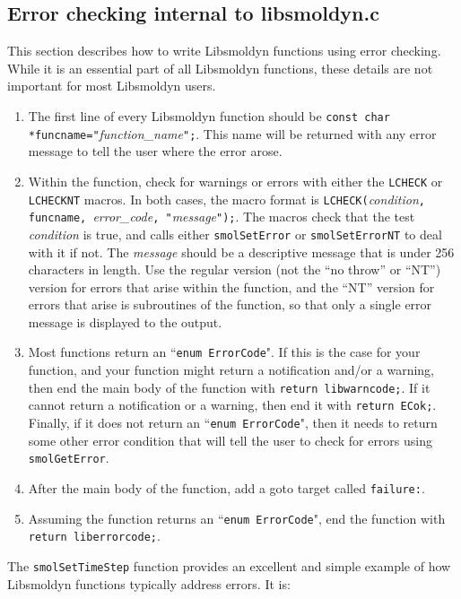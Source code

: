 \documentclass {scrbook}
\newcommand {\ttt} {\texttt}
\begin{document}
\subsection*{Error checking internal to libsmoldyn.c}

This section describes how to write Libsmoldyn functions using error checking. While it is an essential part of all Libsmoldyn functions, these details are not important for most Libsmoldyn users.

\begin{enumerate}
\item The first line of every Libsmoldyn function should be \ttt{const char *funcname="}\emph{function\_name}\ttt{";}. This name will be returned with any error message to tell the user where the error arose.
\item Within the function, check for warnings or errors with either the \ttt{LCHECK} or \ttt{LCHECKNT} macros. In both cases, the macro format is \ttt{LCHECK(}\emph{condition}\ttt{, funcname, }\emph{error\_code}\ttt{, "}\emph{message}\ttt{");}. The macros check that the test \emph{condition} is true, and calls either \ttt{smolSetError} or \ttt{smolSetErrorNT} to deal with it if not. The \emph{message} should be a descriptive message that is under 256 characters in length. Use the regular version (not the ``no throw'' or ``NT'') version for errors that arise within the function, and the ``NT'' version for errors that arise is subroutines of the function, so that only a single error message is displayed to the output.
\item Most functions return an ``\ttt{enum ErrorCode}". If this is the case for your function, and your function might return a notification and/or a warning, then end the main body of the function with \ttt{return libwarncode;}. If it cannot return a notification or a warning, then end it with \ttt{return ECok;}. Finally, if it does not return an ``\ttt{enum ErrorCode}", then it needs to return some other error condition that will tell the user to check for errors using \ttt{smolGetError}.
\item After the main body of the function, add a goto target called \ttt{failure:}.
\item Assuming the function returns an ``\ttt{enum ErrorCode}", end the function with \ttt{return liberrorcode;}.
\end{enumerate}

The \ttt{smolSetTimeStep} function provides an excellent and simple example of how Libsmoldyn functions typically address errors. It is:
\end{document}
